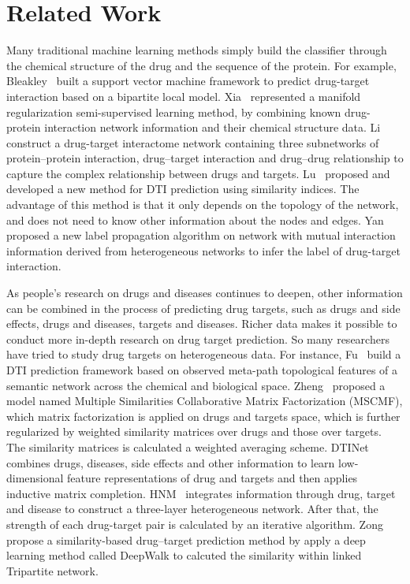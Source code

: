 \documentclass[journal]{IEEEtran}
\begin{document}
\section{Related Work}
Many traditional machine learning methods simply build the classifier through the chemical structure of the drug and the sequence of the protein. For example, Bleakley~\cite{Bleakley2009} built a support vector machine framework to predict drug-target interaction based on a bipartite local model. Xia~\cite{Xia2010Semi} represented a manifold regularization semi-supervised learning method, by combining known drug-protein interaction network information and their chemical structure data. Li~\cite{Li2010} construct a drug-target interactome network containing three subnetworks of protein–protein interaction, drug–target interaction and drug–drug relationship to capture the complex relationship between drugs and targets. Lu~\cite{Lu2017BMC} proposed and developed a new method for DTI prediction using similarity indices. The advantage of this method is that it only depends on the topology of the network, and does not need to know other information about the nodes and edges. Yan~\cite{Yan2016} proposed a new label propagation algorithm on network with mutual interaction information derived from heterogeneous networks to infer the label of drug-target interaction.

As people's research on drugs and diseases continues to deepen, other information can be combined in the process of predicting drug targets, such as drugs and side effects, drugs and diseases, targets and diseases. Richer data makes it possible to conduct more in-depth research on drug target prediction. So many researchers have tried to study drug targets on heterogeneous data. For instance,  Fu~\cite{Fu2016BMC}  build a DTI prediction framework based on observed meta-path topological features of a semantic network across the chemical and biological space. Zheng~\cite{Zheng2013KDD} proposed a model named Multiple Similarities Collaborative Matrix Factorization (MSCMF), which matrix factorization is applied on drugs and targets space, which is further regularized by weighted similarity matrices over drugs and those over targets. The similarity matrices is calculated a weighted averaging scheme. 
DTINet~\cite{Luo2017Network} combines drugs, diseases, side effects and other information to learn low-dimensional feature representations of drug and targets and then applies inductive matrix completion. HNM~\cite{Wang2014Drug} integrates information through drug, target and disease to construct a three-layer heterogeneous network. After that, the strength of each drug-target pair is calculated by an iterative algorithm. Zong~\cite{Zong2017Deep} propose a similarity-based drug–target prediction method by apply a deep learning method called DeepWalk to calcuted the similarity within linked Tripartite network.
\end{document}
